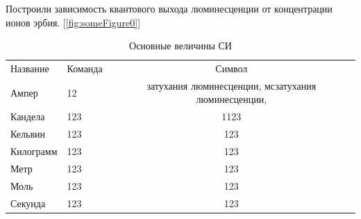Построили зависимость квантового выхода люминесценции от концентрации ионов эрбия. [\ref{fig:someFigure0}]

\begin{table}
    \centering
	\begin{threeparttable}%
    \caption{Основные величины СИ}\label{tab:unit:base}
    \begin{tabular}{llc}
        Название  & Команда                 & Символ         \\
        Ампер     & 12 & затухания   люминесценции, мсзатухания   люминесценции,   \\
        Кандела   & 123 & 1123 \\
        Кельвин   & 123 & 123   \\
        Килограмм & 123 & 123 \\
        Метр      & 123 & 123    \\
        Моль      & 123 & 123     \\
        Секунда   & 123 & 123   \\
    \end{tabular}
	\end{threeparttable}
\end{table}

